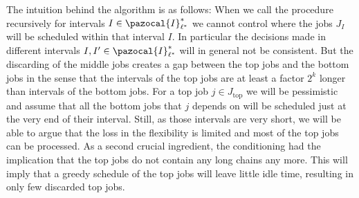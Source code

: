 \documentclass[11pt,letterpaper,oneside,english]{article}
\theoremstyle{theorem}
\begin{document}
The intuition behind the algorithm is as follows:  When we call the procedure recursively for intervals $I \in \pazocal{I}_{\ell^*}^*$
we cannot control where the jobs $J_I$ will be scheduled within that interval $I$. In particular the
decisions made in different intervals $I,I' \in \pazocal{I}_{\ell^*}^*$ will in general not be consistent.
But the discarding of the middle jobs creates a gap between the top 
jobs and the bottom jobs in the sense that the intervals of the top jobs are at least a factor $2^k$
longer than intervals of the bottom jobs. For a top job $j \in J_{\textrm{top}}$ we will be pessimistic and
assume that all the bottom jobs that $j$ depends on will be scheduled just at the very end of their
interval. Still, as those intervals are very short, we will be able to argue that the loss in the
flexibility is limited and most of the top jobs can be processed. As a second crucial ingredient, the
conditioning had the implication that the top jobs do not contain any long chains any more.
This will imply that a greedy
schedule of the top jobs will leave little idle time, resulting in only few discarded top jobs.
\end{document}
